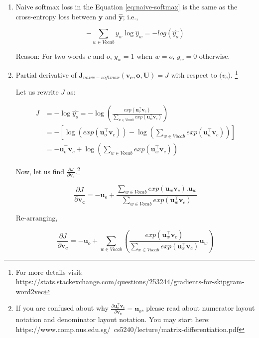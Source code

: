 \documentclass{article}
\begin{document}
	\begin{enumerate}[label=(\alph*)]
		\item Naive softmax loss in the Equation \ref{eq:naive-softmax} is the same as the cross-entropy loss between $\bm{y}$ and $\hat{\bm{y}}$; i.e., 
		
		\begin{equation}
			- \sum\limits_{w \in Vocab} y_w\log{\hat{y}_w} = - log(\hat{y_{o}})
		\end{equation}
		
		
		Reason: For two words $c$ and $o$, $y_w=1$ when $w=o$, $y_w=0$ otherwise. 
		
		
		\item Partial derivative of $\bm{J}_{naive-softmax}\bm{(v_c, o, U)}=J$ with respect to $\bm(v_c)$. \footnote{For more details visit: https://stats.stackexchange.com/questions/253244/gradients-for-skipgram-word2vec}
		
		Let us rewrite $J$ as:
		
		\begin{equation}
		\begin{split}
			J &= -\log{\hat{y_o}} = -\log( \frac{exp(\bm{u}_o^\top \bm{v}_c)}{\sum\limits_{w \in {Vocab}} exp(\bm{u}_w^\top \bm{v}_c)})\\
			&= -[\log(exp(\bm{u}_o^\top \bm{v}_c))-\log({\sum\limits_{w \in {Vocab}} exp(\bm{u}_w^\top\bm{v}_c)})]\\
			&= -\bm{u}_o^\top \bm{v}_c + \log({\sum\limits_{w \in {Vocab}} exp(\bm{u}_w^\top \bm{v}_c)})
		\end{split}
		\end{equation} 
		
		Now, let us find $\frac{\partial J}{\partial \bm{v_c}}$.\footnote{If you are confused about why $\frac{\partial \bm{u}_o^\top \bm{v}_c}{\partial \bm{v_c}} = \bm{u}_o$, please read about numerator layout notation and denominator layout notation. You may start here: https://www.comp.nus.edu.sg/~cs5240/lecture/matrix-differentiation.pdf}
		
		\begin{equation}
			\frac{\partial J}{\partial \bm{v_c}} = - \bm{u}_o + \frac{\sum\limits_{w \in {Vocab}} exp(\bm{u}_w \bm{v}_c).\bm{u}_w}{\sum\limits_{w \in {Vocab}} exp(\bm{u}_w^\top \bm{v}_c)}
		\end{equation}
		
		Re-arranging,
		
		\begin{equation}
			\frac{\partial J}{\partial \bm{v_c}} = - \bm{u}_o + \sum\limits_{w \in {Vocab}}(\frac{exp(\bm{u}_w^\top \bm{v}_c)}{\sum\limits_{x \in {Vocab}} exp(\bm{u}_x^\top \bm{v}_c)}\bm{u}_w)
		\end{equation}
		

\end{enumerate}
\end{document}
